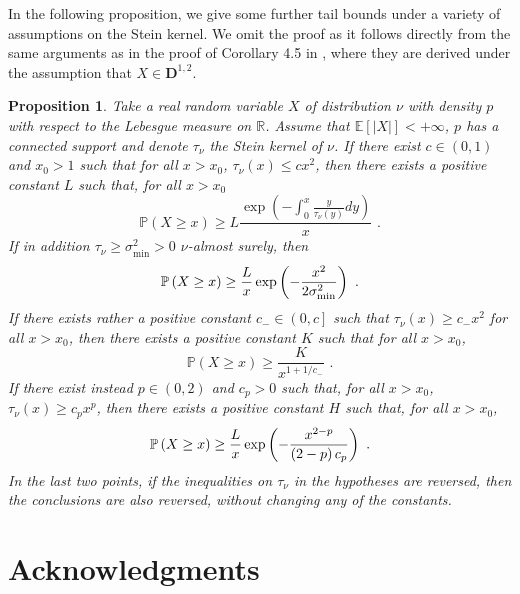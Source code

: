 \documentclass[11pt]{article}
\newtheorem{proposition}[theorem]{Proposition}
\begin{document}
In the following proposition, we give some further tail bounds under a
variety of assumptions on the Stein kernel. We omit the proof as it follows
directly from the same arguments as in the proof of Corollary 4.5 in \cite%
{MR2568291}, where they are derived under the assumption that $X\in \mathbf{D%
}^{1,2}$.

\begin{proposition}
Take a real random variable $X$ of distribution $\nu $ with density $p$ with
respect to the Lebesgue measure on $\mathbb{R}$. Assume that $\mathbb{E}%
\left[ \left\vert X\right\vert \right] <+\infty $, $p$ has a connected
support and denote $\tau _{\nu }$ the Stein kernel of $\nu $. If there exist 
$c\in \left( 0,1\right) $ and $x_{0}>1$ such that for all $x>x_{0}$, $\tau
_{\nu }\left( x\right) \leq cx^{2}$, then there exists a positive constant $%
L $ such that, for all $x>x_{0}$%
\begin{equation*}
\mathbb{P}\left( X\geq x\right) \geq L\frac{\exp \left( -\int_{0}^{x}\frac{y%
}{\tau _{\nu }\left( y\right) }dy\right) }{x}\text{ .}
\end{equation*}%
If in addition $\tau _{\nu }\geq \sigma _{\min }^{2}>0$ $\nu $-almost
surely, then%
\begin{equation*}
\mathbb{P}\left( X\geq x\right) \geq \frac{L}{x}\exp \left( -\frac{x^{2}}{%
2\sigma _{\min }^{2}}\right) \text{ .}
\end{equation*}%
If there exists rather a positive constant $c_{-}\in \left( 0,c\right] $
such that $\tau _{\nu }\left( x\right) \geq c_{-}x^{2}$ for all $x>x_{0}$,
then there exists a positive constant $K$ such that for all $x>x_{0}$,%
\begin{equation*}
\mathbb{P}\left( X\geq x\right) \geq \frac{K}{x^{1+1/c_{-}}}\text{ .}
\end{equation*}%
If there exist instead $p\in \left( 0,2\right) $ and $c_{p}>0$ such that,
for all $x>x_{0}$, $\tau _{\nu }\left( x\right) \geq c_{p}x^{p}$, then there
exists a positive constant $H$ such that, for all $x>x_{0}$,%
\begin{equation*}
\mathbb{P}\left( X\geq x\right) \geq \frac{L}{x}\exp \left( -\frac{x^{2-p}}{%
\left( 2-p\right) c_{p}}\right) \text{ .}
\end{equation*}%
In the last two points, if the inequalities on $\tau _{\nu }$ in the
hypotheses are reversed, then the conclusions are also reversed, without
changing any of the constants.
\end{proposition}

\section*{Acknowledgments}
\end{document}
